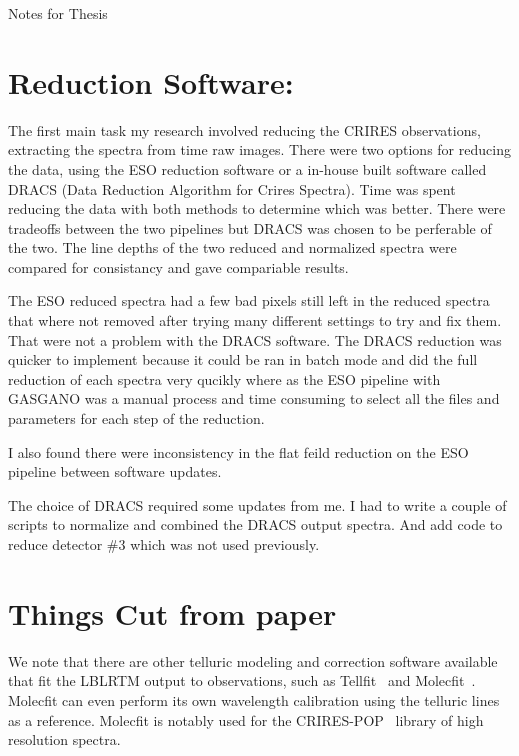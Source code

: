 
Notes for Thesis

\section{Reduction Software:}

The first main task my research involved reducing the CRIRES observations, extracting the spectra from time raw images. There were two options for reducing the data, using the ESO reduction software or a in-house built software called DRACS (Data Reduction Algorithm for Crires Spectra). Time was spent reducing the data with both methods to determine which was better.
There were tradeoffs between the two pipelines but DRACS was chosen to be perferable of the two. The line depths of the two reduced and normalized spectra were compared for consistancy and gave compariable results.

The ESO reduced spectra had a few bad pixels still left in the reduced spectra that where not removed after trying many different settings to try and fix them.
That were not a problem with the DRACS software.
The DRACS reduction was quicker to implement because it could be ran in batch mode and did the full reduction of each spectra very qucikly where as the ESO pipeline with GASGANO was a manual process and time consuming to select all the files and parameters for each step of the reduction.

I also found there were inconsistency in the flat feild reduction on the ESO pipeline between software updates.

The choice of DRACS required some updates from me. I had to write a couple of scripts to normalize and combined the DRACS output spectra. And add code to reduce detector $\#3$ which was not used previously.




\section{Things Cut from paper}

We note that there are other telluric modeling and correction software available that fit the LBLRTM output to observations, such as Tellfit~\citep{gullikson_correcting_2014} and Molecfit~\citep{smette_molecfit:_2015}. Molecfit can even perform its own wavelength calibration using the telluric lines as a reference. Molecfit is notably used for the CRIRES-POP~\citep{nicholls_crires-pop:_2017} library of high resolution spectra.



